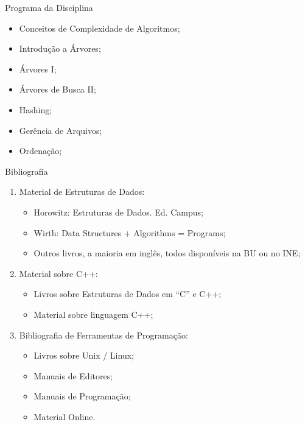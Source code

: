 \documentclass[12pt]{beamer}
\begin{document}
\begin{frame}{Programa da Disciplina}
\begin{itemize}
\item Conceitos de Complexidade de Algoritmos;
\item Introdução a Árvores;
\item Árvores I;
\item Árvores de Busca II;
\item Hashing;
\item Gerência de Arquivos;
\item Ordenação;
\end{itemize}
\end{frame}

\begin{frame}{Bibliografia}
\begin{enumerate}
\item Material de Estruturas de Dados:
\begin{itemize}
\item Horowitz: Estruturas de Dados. Ed. Campus;
\item Wirth: Data Structures + Algorithms = Programs;
\item Outros livros, a maioria em inglês, todos disponíveis na BU ou no INE;
\end{itemize}
\item Material sobre  C++:
\begin{itemize}
\item Livros sobre Estruturas de Dados em “C” e C++;
\item Material sobre linguagem C++;
\end{itemize}
\item Bibliografia de Ferramentas de Programação:
\begin{itemize}
\item Livros sobre Unix / Linux;
\item Manuais de Editores;
\item Manuais de Programação;
\item Material Online.
\end{itemize}
\end{enumerate}
\end{frame}
\end{document}
